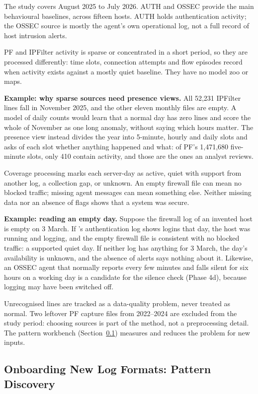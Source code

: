 \documentclass[11pt,a4paper]{article}
\newcommand{\tok}[1]{\texttt{\detokenize{#1}}}
\begin{document}
The study covers August 2025 to July 2026. AUTH and OSSEC provide the main behavioural baselines, across fifteen hosts. AUTH holds authentication activity; the OSSEC source is mostly the agent's own operational log, not a full record of host intrusion alerts.

PF and IPFilter activity is sparse or concentrated in a short period, so they are processed differently: time slots, connection attempts and flow episodes record when activity exists against a mostly quiet baseline. They have no model zoo or maps.

\textbf{Example: why sparse sources need presence views.} All 52,231 IPFilter lines fall in November 2025, and the other eleven monthly files are empty. A model of daily counts would learn that a normal day has zero lines and score the whole of November as one long anomaly, without saying which hours matter. The presence view instead divides the year into 5-minute, hourly and daily slots and asks of each slot whether anything happened and what: of PF's 1,471,680 five-minute slots, only 410 contain activity, and those are the ones an analyst reviews.

Coverage processing marks each server-day as active, quiet with support from another log, a collection gap, or unknown. An empty firewall file can mean no blocked traffic; missing agent messages can mean something else. Neither missing data nor an absence of flags shows that a system was secure.

\textbf{Example: reading an empty day.} Suppose the firewall log of an invented host \tok{host-a} is empty on 3 March. If \tok{host-a}'s authentication log shows logins that day, the host was running and logging, and the empty firewall file is consistent with no blocked traffic: a supported quiet day. If neither log has anything for 3 March, the day's availability is unknown, and the absence of alerts says nothing about it. Likewise, an OSSEC agent that normally reports every few minutes and falls silent for six hours on a working day is a candidate for the silence check (Phase 4d), because logging may have been switched off.

Unrecognised lines are tracked as a data-quality problem, never treated as normal. Two leftover PF capture files from 2022--2024 are excluded from the study period: choosing sources is part of the method, not a preprocessing detail. The pattern workbench (Section~\ref{sec:patterns}) measures and reduces the problem for new inputs.

\subsection{Onboarding New Log Formats: Pattern Discovery}
\label{sec:patterns}
\end{document}

